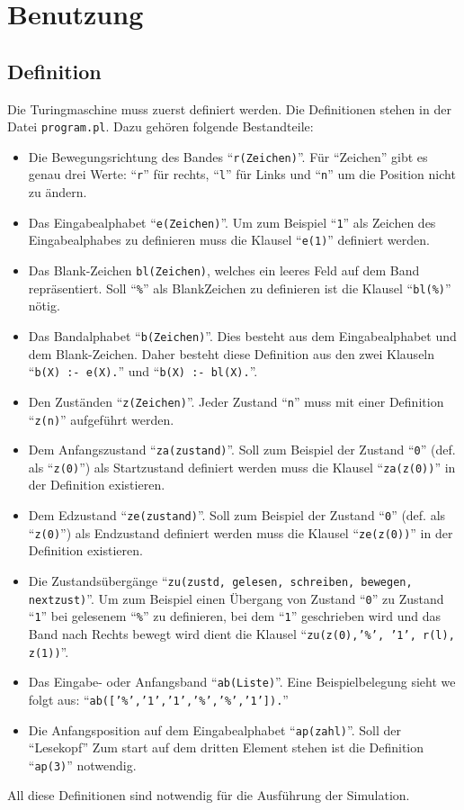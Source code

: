 \documentclass[final,a4paper,11pt,notitlepage,halfparskip]{scrreprt}
\begin{document}
\chapter{Benutzung}

\section{Definition}
Die Turingmaschine muss zuerst definiert werden. Die Definitionen stehen
in der Datei \texttt{program.pl}. Dazu gehören folgende Bestandteile:
\begin{itemize}
    \item Die Bewegungsrichtung des Bandes "`\texttt{r(Zeichen)}"'. Für
	"`Zeichen"' gibt es genau drei Werte: "`\texttt{r}"' für rechts,
	"`\texttt{l}"' für Links und "`\texttt{n}"' um die Position nicht 
	zu ändern.
    \item Das Eingabealphabet "`\texttt{e(Zeichen)}"'. Um zum Beispiel
	"`\texttt{1}"' als Zeichen des Eingabealphabes zu definieren
	muss die Klausel "`\texttt{e(1)}"' definiert werden.
    \item Das Blank-Zeichen \texttt{bl(Zeichen)}, welches ein leeres
	Feld auf dem Band repräsentiert. Soll "`\texttt{\%}"' als
	BlankZeichen zu definieren ist die Klausel "`\texttt{bl(\%)}"'
	nötig.	
    \item Das Bandalphabet "`\texttt{b(Zeichen)}"'. Dies besteht aus 
	dem Eingabealphabet und dem Blank-Zeichen. Daher besteht diese 
	Definition aus den zwei Klauseln "`\texttt{b(X) :- e(X).}"' 
	und "`\texttt{b(X) :- bl(X).}"'.
    \item Den Zuständen "`\texttt{z(Zeichen)}"'. Jeder Zustand
	"`\texttt{n}"' muss mit einer Definition "`\texttt{z(n)}"' 
	aufgeführt werden.	
    \item Dem Anfangszustand "`\texttt{za(zustand)}"'. Soll zum 
	Beispiel der Zustand "`\texttt{0}"' (def. als "`\texttt{z(0)}"') 
	als Startzustand definiert werden muss die Klausel
	"`\texttt{za(z(0))}"' in der Definition existieren.
    \item Dem Edzustand "`\texttt{ze(zustand)}"'. Soll zum 
	Beispiel der Zustand "`\texttt{0}"' (def. als "`\texttt{z(0)}"') 
	als Endzustand definiert werden muss die Klausel
	"`\texttt{ze(z(0))}"' in der Definition existieren.
    \item Die Zustandsübergänge 
	"`\texttt{zu(zustd, gelesen, schreiben, bewegen, nextzust)}"'.
	Um zum Beispiel einen Übergang von Zustand "`\texttt{0}"' zu
	Zustand "`\texttt{1}"' bei gelesenem "`\texttt{\%}"' zu
	definieren, bei dem "`\texttt{1}"' geschrieben wird und das Band
	nach Rechts bewegt wird dient die Klausel 
	"`\texttt{zu(z(0),'\%', '1',  r(l), z(1))}"'.
    \item Das Eingabe- oder Anfangsband "`\texttt{ab(Liste)}"'. Eine
	Beispielbelegung sieht we folgt aus:
	"`\texttt{ab(['\%','1','1','\%','\%','1']).}"'	
    \item Die Anfangsposition auf dem Eingabealphabet
	"`\texttt{ap(zahl)}"'. Soll der "`Lesekopf"' Zum start auf dem
	dritten Element stehen ist die Definition "`\texttt{ap(3)}"'
	notwendig.	
\end{itemize}
All diese Definitionen sind notwendig für die Ausführung der Simulation.
\end{document}
